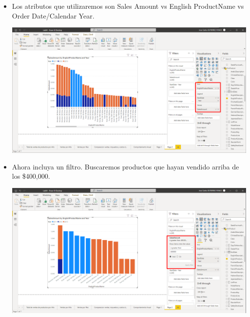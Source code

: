 \documentclass{article}
\begin{document}
\begin{enumerate}[\tab 1.]
\begin{itemize}
            \item Los atributos que utilizaremos son Sales Amount vs English ProductName vs Order Date/Calendar Year.
            \begin{center}
                \includegraphics[width=13cm]{./images/15.1.png}
            \end{center}
            \newpage
            \item Ahora incluya un filtro. Buscaremos productos que hayan vendido arriba de los \$400,000.
            \begin{center}
                \includegraphics[width=13cm]{./images/15.2.png}
            \end{center}
        \end{itemize}
        

\end{enumerate}
\end{document}
